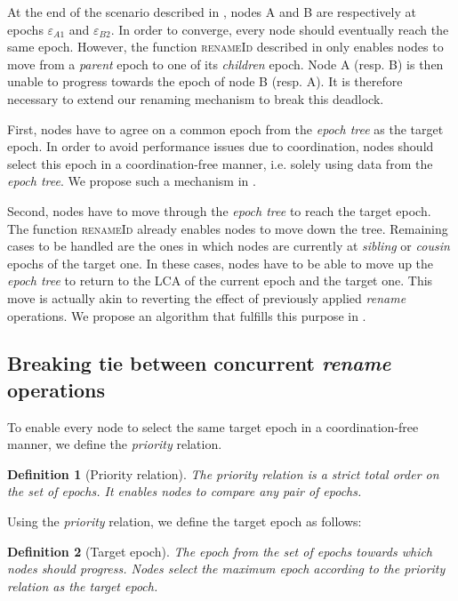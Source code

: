 \documentclass[10pt,journal,compsoc]{IEEEtran}
\newtheorem{definition}{Definition}
\newcommand{\ie}{i.e. }
\newcommand{\epoch}[1]{$\varepsilon_{#1}$}
\begin{document}
At the end of the scenario described in , nodes A and B are respectively at epochs \epoch{A1} and \epoch{B2}.
In order to converge, every node should eventually reach the same epoch.
However, the function \textsc{renameId} described in  only enables nodes to move from a \emph{parent} epoch to one of its \emph{children} epoch.
Node A (resp. B) is then unable to progress towards the epoch of node B (resp. A).
It is therefore necessary to extend our renaming mechanism to break this deadlock.

First, nodes have to agree on a common epoch from the \emph{epoch tree} as the target epoch.
In order to avoid performance issues due to coordination, nodes should select this epoch in a coordination-free manner, \ie solely using data from the \emph{epoch tree}.
We propose such a mechanism in .

Second, nodes have to move through the \emph{epoch tree} to reach the target epoch.
The function \textsc{renameId} already enables nodes to move down the tree.
Remaining cases to be handled are the ones in which nodes are currently at \emph{sibling} or \emph{cousin} epochs of the target one.
In these cases, nodes have to be able to move up the \emph{epoch tree} to return to the \ac{LCA} of the current epoch and the target one.
This move is actually akin to reverting the effect of previously applied \emph{rename} operations.
We propose an algorithm that fulfills this purpose in .

\subsection{Breaking tie between concurrent \emph{rename} operations}
\label{sec:priority}

To enable every node to select the same target epoch in a coordination-free manner, we define the \emph{priority} relation.

\begin{definition}[Priority relation]
    The \emph{priority} relation is a strict total order on the set of epochs.
    It enables nodes to compare any pair of epochs.
\end{definition}

Using the \emph{priority} relation, we define the target epoch as follows:

\begin{definition}[Target epoch]
    The epoch from the set of epochs towards which nodes should progress.
    Nodes select the maximum epoch according to the \emph{priority} relation as the target epoch.
\end{definition}
\end{document}
